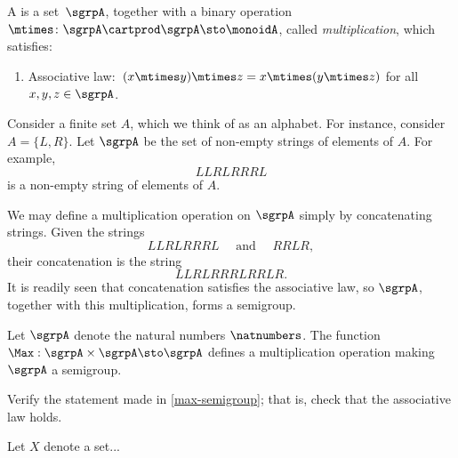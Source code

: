 
\section{}\label{sec:semigroups}


\begin{definition}[Semigroup]
  \label{def:semigroup}
  A \emph{} is a set~$\sgrpA$, together with a binary operation~$\mtimes \colon \sgrpA \cartprod \sgrpA \sto \monoidA$, called \emph{multiplication}, which satisfies:
  \begin{enumerate}
    \item Associative law:~$(x\mtimes y)\mtimes z=x\mtimes (y\mtimes z)$ for all $x , y, z \in \sgrpA$. 
  \end{enumerate}
\end{definition}

\begin{example}\label{string-semigroup}
Consider a finite set $A$, which we think of as an alphabet. For instance, consider $A = \{ L, R \}$. 
Let $\sgrpA$ be the set of non-empty strings of elements of $A$. For example, 
$$ LLRLRRRL $$ 
is a non-empty string of elements of $A$. 

We may define a multiplication operation on $\sgrpA$ simply by concatenating strings. Given the strings
$$ LLRLRRRL  \quad \text{ and } \quad RRLR, $$ 
their concatenation is the string
$$ LLRLRRRLRRLR.$$
It is readily seen that concatenation satisfies the associative law, so $\sgrpA$, together with this multiplication, forms a semigroup. 
\end{example}


\begin{example}\label{max-semigroup}
Let $\sgrpA$ denote the natural numbers $\natnumbers$. The function $\Max : \sgrpA \times \sgrpA \sto \sgrpA$ defines a multiplication operation making $\sgrpA$ a semigroup. 
\end{example}

\begin{exercise}
Verify the statement made in \cref{max-semigroup}; that is, check that the associative law holds. 
\end{exercise}

\begin{example}\label{trafo-semigroup}
Let $X$ denote a set... 
\end{example}

